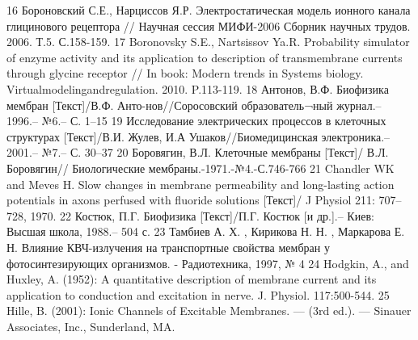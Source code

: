 16	Бороновский С.Е., Нарциссов Я.Р. Электростатическая модель ионного канала глицинового рецептора // Научная сессия МИФИ-2006 Сборник научных трудов. 2006. Т.5. С.158-159.
17	Boronovsky S.E., Nartsissov Ya.R. Probability simulator of enzyme activity and its application to description of transmembrane currents through glycine receptor // In book: Modern trends in Systems biology. Virtualmodelingandregulation. 2010. P.113-119.
18	Антонов, В.Ф. Биофизика мембран [Текст]/В.Ф. Анто-нов//Соросовский образователь¬ный журнал.– 1996.– №6.– С. 1–15
19	Исследование электрических процессов в клеточных структурах [Текст]/В.И. Жулев, И.А Ушаков//Биомедицинская электроника.– 2001.– №7.– С. 30–37
20	Боровягин, В.Л. Клеточные мембраны [Текст]/ В.Л. Боровягин// Биологические мембраны.-1971.-№4.-С.746-766
21	Chandler WK and Meves H. Slow changes in membrane permeability and long-lasting action potentials in axons perfused with fluoride solutions [Текст]/ J Physiol 211: 707–728, 1970.
22	Костюк, П.Г. Биофизика [Текст]/П.Г. Костюк [и др.].– Киев: Высшая школа, 1988.– 504 с.
23	Тамбиев А. Х. , Кирикова Н. Н. , Маркарова Е. Н. Влияние КВЧ-излучения на транспортные свойства мембран у фотосинтезирующих организмов. - Радиотехника, 1997, № 4
24	Hodgkin, A., and Huxley, A. (1952): A quantitative description of membrane current and its application to conduction and excitation in nerve. J. Physiol. 117:500-544.
25	Hille, B. (2001): Ionic Channels of Excitable Membranes. — (3rd ed.). — Sinauer Associates, Inc., Sunderland, MA.
